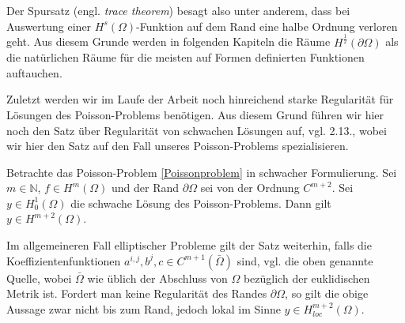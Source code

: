 Der Spursatz (engl. \textit{trace theorem}) besagt also unter anderem, dass bei Auswertung einer $H^{s}(\Omega)$-Funktion auf dem Rand eine halbe Ordnung verloren geht. Aus diesem Grunde werden in folgenden Kapiteln die Räume $H^{\frac{1}{2}}(\partial \Omega)$ als die natürlichen Räume für die meisten auf Formen definierten Funktionen auftauchen.

Zuletzt werden wir im Laufe der Arbeit noch hinreichend starke Regularität für Lösungen des Poisson-Problems benötigen. Aus diesem Grund führen wir hier noch den Satz über Regularität von schwachen Lösungen auf, vgl. \cite{shape_space} 2.13., wobei wir hier den Satz auf den Fall unseres Poisson-Problems spezialisieren.

\begin{theorem}
	Betrachte das Poisson-Problem \ref{Poissonproblem} in schwacher Formulierung. 
	Sei $m\in\mathbb{N}$, $f\in H^m(\Omega)$ und der Rand $\partial\Omega$ sei von der Ordnung $C^{m+2}$. Sei $y\in H^1_0(\Omega)$ die schwache Lösung des Poisson-Problems. Dann gilt $y\in H^{m+2}(\Omega)$.
\end{theorem}

Im allgemeineren Fall elliptischer Probleme gilt der Satz weiterhin, falls die Koeffizientenfunktionen $a^{i,j}, b^j, c\in C^{m+1}(\bar{\Omega})$ sind, vgl. die oben genannte Quelle, wobei $\bar{\Omega}$ wie üblich der Abschluss von $\Omega$ bezüglich der euklidischen Metrik ist. Fordert man keine Regularität des Randes $\partial\Omega$, so gilt die obige Aussage zwar nicht bis zum Rand, jedoch lokal im Sinne $y\in H^{m+2}_{loc}(\Omega)$.
\newpage

